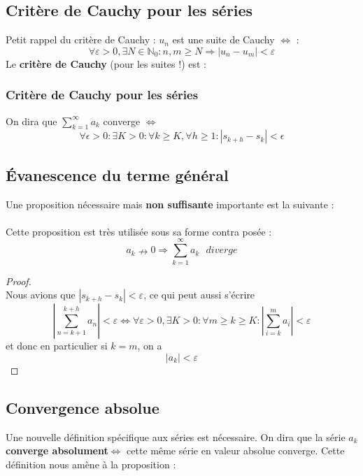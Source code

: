 \documentclass[11pt, a4paper, openany]{book}
\begin{document}
\subsection{Critère de Cauchy pour les séries}
Petit rappel du critère de Cauchy : $u_n$ est une suite de Cauchy $\Leftrightarrow$ :
\begin{equation}
	\forall \varepsilon > 0, \exists N \in \mathbb{N}_0 : n,m \geq N \Rightarrow |u_n - u_m| < \varepsilon
\end{equation}
Le \textbf{critère de Cauchy} (pour les suites !) est : \\
		
\subsubsection{Critère de Cauchy pour les séries}
On dira que $\sum_{k=1}^\infty a_k$ converge $\Leftrightarrow$
\begin{equation}
	\forall \epsilon > 0 : \exists K > 0 : \forall k \geq K, \forall h \geq 1 : |s_{k+h} - s_k| < \epsilon
\end{equation}
		
\subsection{Évanescence du terme général}
Une proposition nécessaire mais \textbf{non suffisante} importante est la suivante : \\
		
\ \\
		
Cette proposition est très utilisée sous sa forme contra posée :
\begin{equation}
	a_k \nrightarrow 0 \Rightarrow \sum_{k=1}^\infty a_k\ \ \ diverge
\end{equation}
\begin{proof}\ \\
	Nous avions que $|s_{k+h} - s_k| < \varepsilon$, ce qui peut aussi s'écrire $$\left|\sum_{n=k+1}^{k+h}a_n\right| < \varepsilon\Leftrightarrow\forall\varepsilon>0,\exists K>0:\forall m\geq k\geq K : \left|\sum_{i=k}^ma_i\right|<\varepsilon$$ et donc en particulier si $k=m$, on a $$|a_k|<\varepsilon$$
\end{proof}
\subsection{Convergence absolue}
Une nouvelle définition spécifique aux séries est nécessaire. On dira que la série $a_k$ \textbf{converge absolument}$\Leftrightarrow$ cette même série en valeur absolue converge. Cette définition nous amène à la proposition :
		
\end{document}
